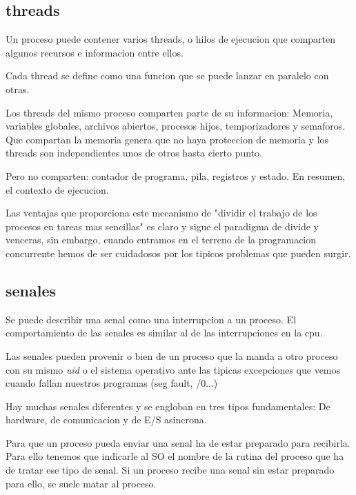 \documentclass[12pt, letterpaper]{article}
\begin{document}
\subsection{threads}

Un proceso puede contener varios threads, o hilos de ejecucion que comparten algunos recursos e informacion entre ellos.\par

Cada thread se define como una funcion que se puede lanzar en paralelo con otras.\par

Los threads del mismo proceso comparten parte de su informacion: Memoria, variables globales, archivos abiertos, procesos hijos, temporizadores y semaforos. Que compartan la memoria genera que no haya proteccion de memoria y los threads son independientes unos de otros hasta cierto punto.\par
Pero no comparten: contador de programa, pila, registros y estado. En resumen, el contexto de ejecucion.\par

Las ventajas que proporciona este mecanismo de "dividir el trabajo de los procesos en tareas mas sencillas" es claro y sigue el paradigma de divide y venceras, sin embargo, cuando entramos en el terreno de la programacion concurrente hemos de ser cuidadosos por los tipicos problemas que pueden surgir.\par

\subsection{senales}

Se puede describir una senal como una interrupcion a un proceso. El comportamiento de las senales es similar al de las interrupciones en la cpu.\par

Las senales pueden provenir o bien de un proceso que la manda a otro proceso con su mismo \textit{uid} o el sistema operativo ante las tipicas excepciones que vemos cuando fallan nuestros programas (seg fault, /0...)\par

Hay muchas senales diferentes y se engloban en tres tipos fundamentales: De hardware, de comunicacion y de E/S asincrona.\par

Para que un proceso pueda enviar una senal ha de estar preparado para recibirla. Para ello tenemos que indicarle al SO el nombre de la rutina del proceso que ha de tratar ese tipo de senal. Si un proceso recibe una senal sin estar preparado para ello, se suele matar al proceso.
\end{document}
